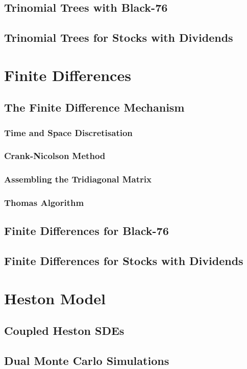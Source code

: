 \documentclass[12pt]{article}
\numberwithin{equation}{section}
\begin{document}
\subsection{Trinomial Trees with Black-76}
\subsection{Trinomial Trees for Stocks with Dividends}

\section{Finite Differences}
\subsection{The Finite Difference Mechanism}
\subsubsection{Time and Space Discretisation}
\subsubsection{Crank-Nicolson Method}
\subsubsection{Assembling the Tridiagonal Matrix}
\subsubsection{Thomas Algorithm}
\subsection{Finite Differences for Black-76}
\subsection{Finite Differences for Stocks with Dividends}

\section{Heston Model}
\subsection{Coupled Heston SDEs}
\subsection{Dual Monte Carlo Simulations}
\end{document}
